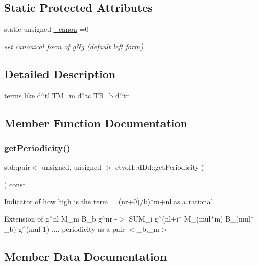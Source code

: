 \subsection*{Static Protected Attributes}
\begin{DoxyCompactItemize}
\item 
static unsigned \mbox{\hyperlink{classetvo_i_i_1_1d_dd_a1cd22bcfb9f4de6ed59ce6b2d625d2e8}{\+\_\+canon}} =0
\begin{DoxyCompactList}\small\item\em set canonical form of \mbox{\hyperlink{classetvo_i_i_1_1g_ng}{g\+Ng}} (default left form) \end{DoxyCompactList}\end{DoxyCompactItemize}


\subsection{Detailed Description}
terms like d$^\wedge$tl T\+M\+\_\+m d$^\wedge$tc T\+B\+\_\+b d$^\wedge$tr 

\subsection{Member Function Documentation}
\mbox{\label{classetvo_i_i_1_1d_dd_a6ef96d675203b5ea5d63792b1869c9b5}} 
\subsubsection{\texorpdfstring{get\+Periodicity()}{getPeriodicity()}}
{\footnotesize\ttfamily std\+::pair$<$ unsigned, unsigned $>$ etvo\+I\+I\+::d\+Dd\+::get\+Periodicity (\begin{DoxyParamCaption}{ }\end{DoxyParamCaption}) const}



Indicator of how high is the term = (nr+0)/b)$\ast$m+nl as a rational. 

Extension of g$^\wedge$nl M\+\_\+m B\+\_\+b g$^\wedge$nr -\/$>$ S\+U\+M\+\_\+i g$^\wedge$(nl+i$\ast$ M\+\_\+(mul$\ast$m) B\+\_\+(mul$\ast$\+\_\+b) g$^\wedge$(mul-\/1) .... periodicity as a pair $<$\+\_\+b,\+\_\+m$>$ 

\subsection{Member Data Documentation}
\mbox{\label{classetvo_i_i_1_1d_dd_a1cd22bcfb9f4de6ed59ce6b2d625d2e8}} 
